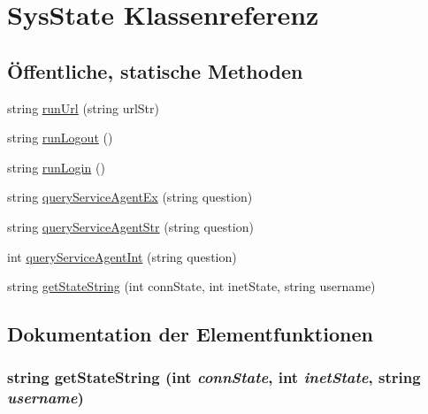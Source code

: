 \hypertarget{classQbeSAS_1_1SysState}{
\section{Sys\-State Klassenreferenz}
\label{classQbeSAS_1_1SysState}
}
\subsection*{\"{O}ffentliche, statische Methoden}
\begin{CompactItemize}
\item 
string \hyperlink{classQbeSAS_1_1SysState_QbeSAS_1_1SysStatee0}{run\-Url} (string url\-Str)
\item 
string \hyperlink{classQbeSAS_1_1SysState_QbeSAS_1_1SysStatee1}{run\-Logout} ()
\item 
string \hyperlink{classQbeSAS_1_1SysState_QbeSAS_1_1SysStatee2}{run\-Login} ()
\item 
string \hyperlink{classQbeSAS_1_1SysState_QbeSAS_1_1SysStatee3}{query\-Service\-Agent\-Ex} (string question)
\item 
string \hyperlink{classQbeSAS_1_1SysState_QbeSAS_1_1SysStatee4}{query\-Service\-Agent\-Str} (string question)
\item 
int \hyperlink{classQbeSAS_1_1SysState_QbeSAS_1_1SysStatee5}{query\-Service\-Agent\-Int} (string question)
\item 
string \hyperlink{classQbeSAS_1_1SysState_QbeSAS_1_1SysStatee6}{get\-State\-String} (int conn\-State, int inet\-State, string username)
\end{CompactItemize}


\subsection{Dokumentation der Elementfunktionen}
\hypertarget{classQbeSAS_1_1SysState_QbeSAS_1_1SysStatee6}{
\subsubsection[getStateString]{\setlength{\rightskip}{0pt plus 5cm}string get\-State\-String (int {\em conn\-State}, int {\em inet\-State}, string {\em username})}}
\label{classQbeSAS_1_1SysState_QbeSAS_1_1SysStatee6}




